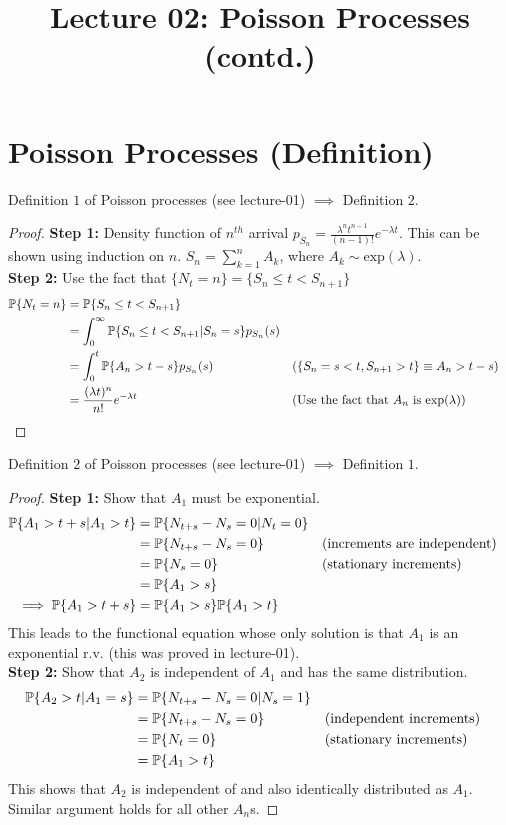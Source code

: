 \documentclass[a4paper,10pt,english]{article}
\title{Lecture 02: Poisson Processes (contd.)}
\author{}
\begin{document}
\maketitle
\section{Poisson Processes (Definition)}

\begin{thm*}[]
Definition $1$ of Poisson processes (see lecture-01) $\implies$ Definition $2$.
\begin{proof} 
\textbf{Step 1:} Density function of $n^{th}$ arrival $p_{S_n} = \frac{\lambda^n t^{n-1}}{(n-1)!} e^{-\lambda t}$. This can be shown using induction on $n$. $S_n = \sum_{k=1}^n A_k$, where $A_k \sim \mathrm{exp}(\lambda)$.\\
\textbf{Step 2:} Use the fact that $\{N_t = n\} = \{S_n \leq t < S_{n+1}\}$
\begin{align*}
\P\{N_t = n\} &= \P\{S_n \leq t < S_{n+1} \} \\
 &= \int_0^\infty \P\{S_n \leq t < S_{n+1} |S_n = s\} p_{S_n}(s) \\
 &= \int_0^t \P\{A_n > t-s\} p_{S_n}(s) &&\text{($\{S_n =  s<t, S_{n+1} > t\} \equiv A_n > t-s$)}\\
 &= 	\frac{(\lambda t)^n}{n!} e^{-\lambda t} &&\text{(Use the fact  that $A_n$ is $\mathrm{exp}(\lambda$))} \qedhere
\end{align*}
\end{proof}
\end{thm*}
\begin{thm*}[]
Definition $2$ of Poisson processes (see lecture-01) $\implies$ Definition $1$.
\begin{proof} 
\textbf{Step 1:} Show that $A_1$  must be exponential.
\begin{align*}
\P\{A_1 > t+s|A_1>t\} &= \P\{N_{t+s}-N_s = 0|N_t = 0\} \\
 &= \P\{N_{t+s}-N_s = 0\} &&\text{(increments are independent)}\\
 &= \P\{N_s = 0\} &&\text{(stationary increments)}\\
 &= \P\{A_1 > s\} \\  
 \implies \P\{A_1 > t+s\} &=  \P\{A_1 > s\} \P\{A_1 > t\}
\end{align*}
This leads to the functional equation whose only solution is that $A_1$ is an exponential r.v. (this was proved in lecture-01).\\
\textbf{Step 2:} Show that $A_2$ is independent of $A_1$ and has the same distribution. 
\begin{align*}
\P\{A_2>t|A_1 = s\} &= \P\{N_{t+s} -N_s = 0|N_s = 1\} \\
&= \P\{N_{t+s} -N_s = 0\} && \text{(independent increments)}\\
&= \P\{N_{t} = 0\} && \text{(stationary increments)}\\
&= \P\{A_1>t\}
\end{align*}
This shows that $A_2$ is independent of and also identically distributed as $A_1$. Similar argument holds for all other $A_n$s.
\end{proof}
\end{thm*}
\end{document}
